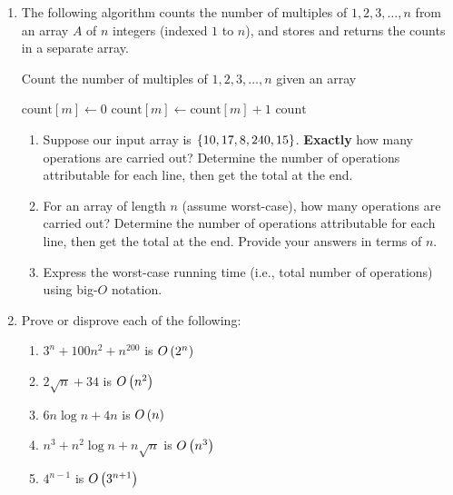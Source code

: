 \begin{exercises}
\begin{enumerate}
    \item The following algorithm counts the number of multiples of $1, 2, 3, \ldots, n$ from an array $A$ of $n$ integers (indexed $1$ to $n$), and stores and returns the counts in a separate array.
    \begin{algorithm}[H]
        \caption{Count the number of multiples of $1, 2, 3, \ldots, n$ given an array}
        \begin{algorithmic}[1]
                \State $\mathrm{count}[m] \gets 0$
            \EndFor
                        \State $\mathrm{count}[m] \gets \mathrm{count}[m] + 1$
                    \EndIf
                \EndFor
            \EndFor
            \Return $\mathrm{count}$
            \EndFunction
        \end{algorithmic}
    \end{algorithm}
    \begin{enumerate}
        \item Suppose our input array is $\left\{10,17,8,240,15\right\}$. \textbf{Exactly} how many operations are carried out? Determine the number of operations attributable for each line, then get the total at the end.
        \item For an array of length $n$ (assume worst-case), how many operations are carried out? Determine the number of operations attributable for each line, then get the total at the end. Provide your answers in terms of $n$.
        \item Express the worst-case running time (i.e., total number of operations) using big-$O$ notation.
        
    \end{enumerate}
    
    \item Prove or disprove each of the following:
    \begin{enumerate}
        \item $3^n + 100n^2 + n^{200}$ is $O\left(2^n \right)$
        \item $2\sqrt{n} + 34$ is $O\left(n^2 \right)$
        \item $6n \log{n} + 4n$ is $O\left(n \right)$
        \item $n^3 + n^2 \log{n} + n \sqrt{n}$ is $O\left(n^3 \right)$
        \item $4^{n-1}$ is $O\left(3^{n+1} \right)$
    \end{enumerate}
    

\end{enumerate}
\end{exercises}
